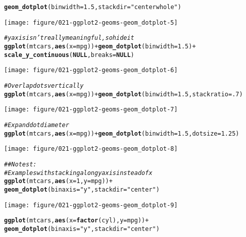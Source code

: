 \documentclass[a4paper,titlepage]{tufte-handout}\usepackage[]{graphicx}\usepackage[]{color}
\makeatletter
\def\maxwidth{ %
  \ifdim\Gin@nat@width>\linewidth
    \linewidth
  \else
    \Gin@nat@width
  \fi
}
\newcommand{\hlnum}[1]{\textcolor[rgb]{0.686,0.059,0.569}{#1}}%
\newcommand{\hlstr}[1]{\textcolor[rgb]{0.192,0.494,0.8}{#1}}%
\newcommand{\hlcom}[1]{\textcolor[rgb]{0.678,0.584,0.686}{\textit{#1}}}%
\newcommand{\hlopt}[1]{\textcolor[rgb]{0,0,0}{#1}}%
\newcommand{\hlstd}[1]{\textcolor[rgb]{0.345,0.345,0.345}{#1}}%
\newcommand{\hlkwa}[1]{\textcolor[rgb]{0.161,0.373,0.58}{\textbf{#1}}}%
\newcommand{\hlkwc}[1]{\textcolor[rgb]{0.333,0.667,0.333}{#1}}%
\newcommand{\hlkwd}[1]{\textcolor[rgb]{0.737,0.353,0.396}{\textbf{#1}}}%
\newenvironment{kframe}{%
 \def\at@end@of@kframe{}%
 \ifinner\ifhmode%
  \def\at@end@of@kframe{\end{minipage}}%
  \begin{minipage}{\columnwidth}%
 \fi\fi%
 \def\FrameCommand##1{\hskip\@totalleftmargin \hskip-\fboxsep
 \colorbox{shadecolor}{##1}\hskip-\fboxsep
     \hskip-\linewidth \hskip-\@totalleftmargin \hskip\columnwidth}%
 \MakeFramed {\advance\hsize-\width
   \@totalleftmargin\z@ \linewidth\hsize
   \@setminipage}}%
 {\par\unskip\endMakeFramed%
 \at@end@of@kframe}
\newenvironment{knitrout}{}{} %
\makeatother
\begin{document}
\begin{knitrout}
\begin{kframe}
\begin{alltt}
  \hlkwd{geom_dotplot}\hlstd{(}\hlkwc{binwidth} \hlstd{=} \hlnum{1.5}\hlstd{,} \hlkwc{stackdir} \hlstd{=} \hlstr{"centerwhole"}\hlstd{)}
\end{alltt}
\end{kframe}
\texttt{[image: figure/021-ggplot2-geoms-geom\_dotplot-5]} 
\begin{kframe}\begin{alltt}
\hlcom{# y axis isn't really meaningful, so hide it}
\hlkwd{ggplot}\hlstd{(mtcars,} \hlkwd{aes}\hlstd{(}\hlkwc{x} \hlstd{= mpg))} \hlopt{+} \hlkwd{geom_dotplot}\hlstd{(}\hlkwc{binwidth} \hlstd{=} \hlnum{1.5}\hlstd{)} \hlopt{+}
  \hlkwd{scale_y_continuous}\hlstd{(}\hlkwa{NULL}\hlstd{,} \hlkwc{breaks} \hlstd{=} \hlkwa{NULL}\hlstd{)}
\end{alltt}
\end{kframe}
\texttt{[image: figure/021-ggplot2-geoms-geom\_dotplot-6]} 
\begin{kframe}\begin{alltt}
\hlcom{# Overlap dots vertically}
\hlkwd{ggplot}\hlstd{(mtcars,} \hlkwd{aes}\hlstd{(}\hlkwc{x} \hlstd{= mpg))} \hlopt{+} \hlkwd{geom_dotplot}\hlstd{(}\hlkwc{binwidth} \hlstd{=} \hlnum{1.5}\hlstd{,} \hlkwc{stackratio} \hlstd{=} \hlnum{.7}\hlstd{)}
\end{alltt}
\end{kframe}
\texttt{[image: figure/021-ggplot2-geoms-geom\_dotplot-7]} 
\begin{kframe}\begin{alltt}
\hlcom{# Expand dot diameter}
\hlkwd{ggplot}\hlstd{(mtcars,} \hlkwd{aes}\hlstd{(}\hlkwc{x} \hlstd{= mpg))} \hlopt{+} \hlkwd{geom_dotplot}\hlstd{(}\hlkwc{binwidth} \hlstd{=} \hlnum{1.5}\hlstd{,} \hlkwc{dotsize} \hlstd{=} \hlnum{1.25}\hlstd{)}
\end{alltt}
\end{kframe}
\texttt{[image: figure/021-ggplot2-geoms-geom\_dotplot-8]} 
\begin{kframe}\begin{alltt}
\hlcom{## No test: }
\hlcom{# Examples with stacking along y axis instead of x}
\hlkwd{ggplot}\hlstd{(mtcars,} \hlkwd{aes}\hlstd{(}\hlkwc{x} \hlstd{=} \hlnum{1}\hlstd{,} \hlkwc{y} \hlstd{= mpg))} \hlopt{+}
  \hlkwd{geom_dotplot}\hlstd{(}\hlkwc{binaxis} \hlstd{=} \hlstr{"y"}\hlstd{,} \hlkwc{stackdir} \hlstd{=} \hlstr{"center"}\hlstd{)}
\end{alltt}


{\ttfamily\noindent\itshape\color{messagecolor}{\#\# `stat\_bindot()` using `bins = 30`. Pick better value with `binwidth`.}}\end{kframe}
\texttt{[image: figure/021-ggplot2-geoms-geom\_dotplot-9]} 
\begin{kframe}\begin{alltt}
\hlkwd{ggplot}\hlstd{(mtcars,} \hlkwd{aes}\hlstd{(}\hlkwc{x} \hlstd{=} \hlkwd{factor}\hlstd{(cyl),} \hlkwc{y} \hlstd{= mpg))} \hlopt{+}
  \hlkwd{geom_dotplot}\hlstd{(}\hlkwc{binaxis} \hlstd{=} \hlstr{"y"}\hlstd{,} \hlkwc{stackdir} \hlstd{=} \hlstr{"center"}\hlstd{)}
\end{alltt}



\end{kframe}
\end{knitrout}
\end{document}
